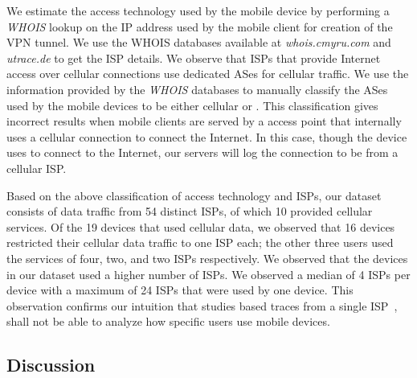 We estimate the access technology used by the mobile device by performing a \emph{WHOIS} lookup on the IP address used by the mobile client for creation of the VPN tunnel. 
We use the WHOIS databases available at \emph{whois.cmyru.com} and \emph{utrace.de} to get the ISP details.
We observe that ISPs that provide Internet access over cellular connections use dedicated ASes for cellular traffic. 
We use the information provided by the \emph{WHOIS} databases to manually classify the ASes used by the mobile devices to be either cellular or \wifi.
This classification gives incorrect results when mobile clients are served by a \wifi access point that internally uses a cellular connection to connect the Internet.
In this case, though the device uses \wifi to connect to the Internet, our servers will log the connection to be from a cellular ISP. 


Based on the above classification of access technology and ISPs, our dataset consists of data traffic from 54 distinct ISPs, of which 10 provided cellular services.
Of the 19 devices that used cellular data, we observed that 16 devices restricted their cellular data traffic to one ISP each; the other three users used the services of four, two, and two ISPs respectively.
We observed that the devices in our dataset used a higher number of \wifi ISPs.
We observed a median of 4 \wifi ISPs per device with a maximum of 24 \wifi ISPs that were used by one device.
This observation confirms our intuition that studies based traces from a single ISP~\cite{maier:mobtraffic, vallina-rod:ads}, shall not be able to analyze how specific users use mobile devices. 

\subsection{Discussion}

